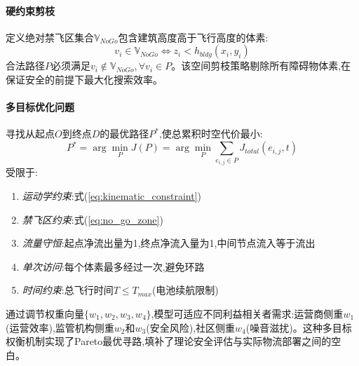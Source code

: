 \paragraph{硬约束剪枝}

定义绝对禁飞区集合$\mathbb{V}_{NoGo}$包含建筑高度高于飞行高度的体素:
\begin{equation}
v_i \in \mathbb{V}_{NoGo} \iff z_i < h_{bldg}(x_i, y_i)
\label{eq:no_go_zone}
\end{equation}
合法路径$P$必须满足$v_i \notin \mathbb{V}_{NoGo}, \forall v_i \in P$。该空间剪枝策略剔除所有障碍物体素,在保证安全的前提下最大化搜索效率。

\paragraph{多目标优化问题}

寻找从起点$O$到终点$D$的最优路径$P^*$,使总累积时空代价最小:
\begin{equation}
P^* = \arg\min_{P} J(P) = \arg\min_{P} \sum_{e_{i,j} \in P} J_{total}(e_{i,j}, t)
\label{eq:optimization_problem}
\end{equation}
受限于:
\begin{enumerate}
    \item \textit{运动学约束}:式(\ref{eq:kinematic_constraint})
    \item \textit{禁飞区约束}:式(\ref{eq:no_go_zone})
    \item \textit{流量守恒}:起点净流出量为1,终点净流入量为1,中间节点流入等于流出
    \item \textit{单次访问}:每个体素最多经过一次,避免环路
    \item \textit{时间约束}:总飞行时间$T \leq T_{max}$(电池续航限制)
\end{enumerate}

通过调节权重向量$\{w_1,w_2,w_3,w_4\}$,模型可适应不同利益相关者需求:运营商侧重$w_1$(运营效率),监管机构侧重$w_2$和$w_3$(安全风险),社区侧重$w_4$(噪音滋扰)。这种多目标权衡机制实现了Pareto最优寻路,填补了理论安全评估与实际物流部署之间的空白。
